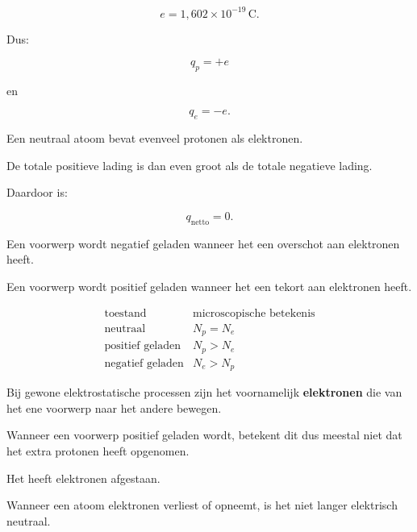 \documentclass{ximera}
\begin{document}
\[
\boxed{
e=1{,}602\times10^{-19}\,\mathrm C.
}
\]

Dus:

\[
q_p=+e
\]

en

\[
q_e=-e.
\]




Een neutraal atoom bevat evenveel protonen als elektronen.

De totale positieve lading is dan even groot als de totale negatieve
lading.

Daardoor is:

\[
\boxed{q_\mathrm{netto}=0.}
\]


Een voorwerp wordt negatief geladen wanneer het een overschot aan
elektronen heeft.

Een voorwerp wordt positief geladen wanneer het een tekort aan
elektronen heeft.


\begin{center}
\[
\boxed{
\begin{array}{c|c}
\text{toestand} & \text{microscopische betekenis}\\
\hline
\text{neutraal}
&
N_p=N_e
\\[1mm]
\text{positief geladen}
&
N_p>N_e
\\[1mm]
\text{negatief geladen}
&
N_e>N_p
\end{array}
}
\]
\end{center}


\begin{opmerking}

Bij gewone elektrostatische processen zijn het voornamelijk
\textbf{elektronen} die van het ene voorwerp naar het andere bewegen.

Wanneer een voorwerp positief geladen wordt, betekent dit dus meestal
niet dat het extra protonen heeft opgenomen.

Het heeft elektronen afgestaan.

\end{opmerking}




Wanneer een atoom elektronen verliest of opneemt, is het niet langer
elektrisch neutraal.
\end{document}
